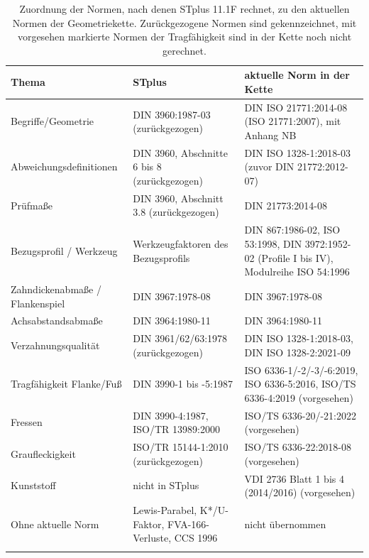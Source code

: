\begin{table}[htbp]
    \caption{Zuordnung der Normen, nach denen STplus 11.1F rechnet, zu den aktuellen Normen der Geometriekette. Zurückgezogene Normen sind gekennzeichnet, mit vorgesehen markierte Normen der Tragfähigkeit sind in der Kette noch nicht gerechnet.}
    \label{tab:anhang_normzuordnung}
    \centering
    \footnotesize
    \setlength{\tabcolsep}{4pt}
    \begin{tabular}{L{3.7cm}L{4.5cm}L{6.0cm}}
        Thema & STplus & aktuelle Norm in der Kette \\
        \hline
        Begriffe/Geometrie & DIN 3960:1987-03 (zurückgezogen) & DIN ISO 21771:2014-08 (ISO 21771:2007), mit Anhang NB \\
        \hline
        Abweichungsdefinitionen & DIN 3960, Abschnitte 6 bis 8 (zurückgezogen) & DIN ISO 1328-1:2018-03 (zuvor DIN 21772:2012-07) \\
        \hline
        Prüfmaße & DIN 3960, Abschnitt 3.8 (zurückgezogen) & DIN 21773:2014-08 \\
        \hline
        Bezugsprofil / Werkzeug & Werkzeugfaktoren des Bezugsprofils & DIN 867:1986-02, ISO 53:1998, DIN 3972:1952-02 (Profile I bis IV), Modulreihe ISO 54:1996 \\
        \hline
        Zahndickenabmaße / Flankenspiel & DIN 3967:1978-08 & DIN 3967:1978-08 \\
        \hline
        Achsabstandsabmaße & DIN 3964:1980-11 & DIN 3964:1980-11 \\
        \hline
        Verzahnungsqualität & DIN 3961/62/63:1978 (zurückgezogen) & DIN ISO 1328-1:2018-03, DIN ISO 1328-2:2021-09 \\
        \hline
        Tragfähigkeit Flanke/Fuß & DIN 3990-1 bis -5:1987 & ISO 6336-1/-2/-3/-6:2019, ISO 6336-5:2016, ISO/TS 6336-4:2019 (vorgesehen) \\
        \hline
        Fressen & DIN 3990-4:1987, ISO/TR 13989:2000 & ISO/TS 6336-20/-21:2022 (vorgesehen) \\
        \hline
        Graufleckigkeit & ISO/TR 15144-1:2010 (zurückgezogen) & ISO/TS 6336-22:2018-08 (vorgesehen) \\
        \hline
        Kunststoff & nicht in STplus & VDI 2736 Blatt 1 bis 4 (2014/2016) (vorgesehen) \\
        \hline
        Ohne aktuelle Norm & Lewis-Parabel, K*/U-Faktor, FVA-166-Verluste, CCS 1996 & nicht übernommen \\
        \hline
    \end{tabular}
\end{table}
